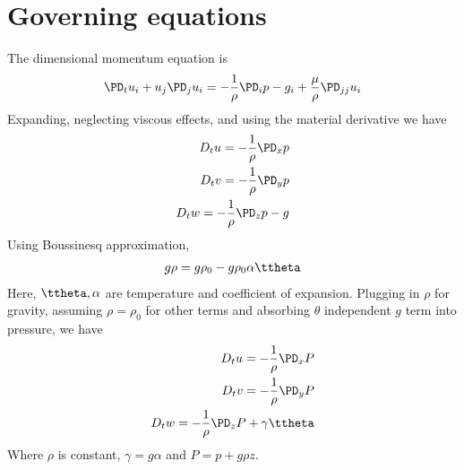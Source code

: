 \documentclass[11pt]{article}
\begin{document}
\doublespacing
\MOONSTITLE

\section{Governing equations}
The dimensional momentum equation is
\begin{equation}\begin{aligned}
\PD_t u_i+u_j\PD_j u_i = -\frac{1}{\rho} \PD_i p - g_i + \frac{\mu}{\rho} \PD_{jj} u_i \\
\end{aligned} \end{equation}
Expanding, neglecting viscous effects, and using the material derivative we have
\begin{equation}\begin{aligned}
D_t u = -\frac{1}{\rho} \PD_x p     \\
D_t v = -\frac{1}{\rho} \PD_y p     \\
D_t w = -\frac{1}{\rho} \PD_z p - g \\
\end{aligned} \end{equation}
Using Boussinesq approximation,
\begin{equation}\begin{aligned}
g \rho = g \rho_0 - g \rho_0 \alpha \ttheta
\end{aligned} \end{equation}
Here, $\ttheta, \alpha$ are temperature and coefficient of expansion.
Plugging in $\rho$ for gravity, assuming $\rho=\rho_0$ for other terms and absorbing $\theta$ independent $g$ term into pressure, we have
\begin{equation}\begin{aligned}
D_t u = -\frac{1}{\rho} \PD_x P     \\
D_t v = -\frac{1}{\rho} \PD_y P     \\
D_t w = -\frac{1}{\rho} \PD_z P + \gamma \ttheta \\
\end{aligned} \end{equation}
Where $\rho$ is constant, $\gamma=g\alpha$ and $P=p + g\rho z$.
\end{document}
